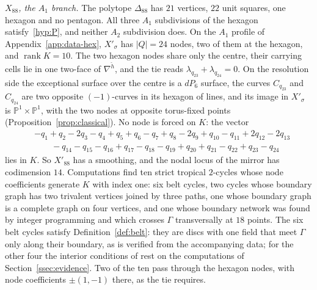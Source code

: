 \emph{$X_{88}$, the $A_1$ branch.} The polytope $\Delta_{88}$ has $21$ vertices, $22$ unit squares, one hexagon and no
pentagon. All three $A_1$ subdivisions of the hexagon satisfy~\ref{hyp:P}, and neither $A_2$ subdivision does. On the $A_1$ profile
of Appendix~\ref{app:data-hex}, $X'_\sigma$ has $|Q|=24$ nodes, two of them at the hexagon, and $\operatorname{rank}K=10$. The
two hexagon nodes share only the centre, their carrying cells lie in one two-face of $\nabla^{\check h}$, and the
tie reads $\lambda_{q_{23}}+\lambda_{q_{24}}=0$. On the resolution side the exceptional surface over the centre is a
$dP_6$ surface, the curves $C_{q_{23}}$ and $C_{q_{24}}$ are two opposite $(-1)$-curves in its hexagon of lines, and its
image in $X'_\sigma$ is $\mathbb P^1\times\mathbb P^1$, with the two nodes at opposite torus-fixed points
(Proposition~\ref{prop:classical}). No node is forced on $K$: the vector
\[
\begin{aligned}
&-q_1+q_2-2q_3-q_4+q_5+q_6-q_7+q_8-2q_9+q_{10}-q_{11}+2q_{12}-2q_{13}\\
&\qquad-q_{14}-q_{15}-q_{16}+q_{17}-q_{18}-q_{19}+q_{20}+q_{21}-q_{22}+q_{23}-q_{24}
\end{aligned}
\]
lies in $K$. So $X'_{88}$ has a smoothing, and the nodal locus of the mirror has codimension $14$. Computations find ten
strict tropical $2$-cycles whose node coefficients generate $K$ with index one: six belt cycles, two cycles
whose boundary graph has two trivalent vertices joined by three paths, one whose boundary graph is a complete graph on
four vertices, and one whose boundary network was found by integer programming and which crosses $\Gamma$ transversally
at $18$ points. The six belt cycles satisfy Definition~\ref{def:belt}: they are discs with one field that meet $\Gamma$
only along their boundary, as is verified from the accompanying data; for the other four the interior conditions of
\cite[Def.~7.2]{CBM} rest on the computations of Section~\ref{ssec:evidence}. Two of the ten pass through the hexagon nodes, with node coefficients $\pm(1,-1)$ there, as the tie requires.

